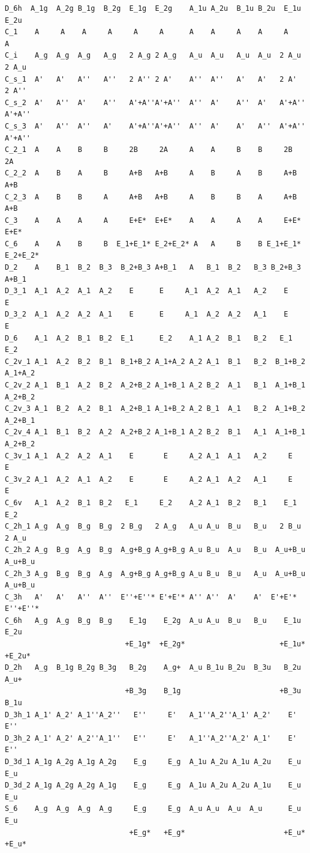 \documentclass[12pt,a4paper]{article}
\begin{document}
\begin{verbatim}
D_6h  A_1g  A_2g B_1g  B_2g  E_1g  E_2g    A_1u A_2u  B_1u B_2u  E_1u  E_2u
C_1    A     A    A     A     A     A      A    A     A    A     A     A
C_i    A_g  A_g  A_g   A_g   2 A_g 2 A_g   A_u  A_u   A_u  A_u  2 A_u  2 A_u
C_s_1  A'   A'   A''   A''   2 A'' 2 A'    A''  A''   A'   A'   2 A'   2 A'' 
C_s_2  A'   A''  A'    A''   A'+A''A'+A''  A''  A'    A''  A'   A'+A'' A'+A''
C_s_3  A'   A''  A''   A'    A'+A''A'+A''  A''  A'    A'   A''  A'+A'' A'+A'' 
C_2_1  A    A    B     B     2B     2A     A    A     B    B     2B     2A
C_2_2  A    B    A     B     A+B   A+B     A    B     A    B     A+B    A+B
C_2_3  A    B    B     A     A+B   A+B     A    B     B    A     A+B    A+B
C_3    A    A    A     A     E+E*  E+E*    A    A     A    A     E+E*   E+E*
C_6    A    A    B     B  E_1+E_1* E_2+E_2* A   A     B    B E_1+E_1* E_2+E_2*
D_2    A    B_1  B_2  B_3  B_2+B_3 A+B_1   A   B_1  B_2   B_3 B_2+B_3 A+B_1 
D_3_1  A_1  A_2  A_1  A_2    E      E     A_1  A_2  A_1   A_2    E      E
D_3_2  A_1  A_2  A_2  A_1    E      E     A_1  A_2  A_2   A_1    E      E
D_6    A_1  A_2  B_1  B_2  E_1      E_2    A_1 A_2  B_1   B_2   E_1    E_2
C_2v_1 A_1  A_2  B_2  B_1  B_1+B_2 A_1+A_2 A_2 A_1  B_1   B_2  B_1+B_2 A_1+A_2
C_2v_2 A_1  B_1  A_2  B_2  A_2+B_2 A_1+B_1 A_2 B_2  A_1   B_1  A_1+B_1 A_2+B_2
C_2v_3 A_1  B_2  A_2  B_1  A_2+B_1 A_1+B_2 A_2 B_1  A_1   B_2  A_1+B_2 A_2+B_1
C_2v_4 A_1  B_1  B_2  A_2  A_2+B_2 A_1+B_1 A_2 B_2  B_1   A_1  A_1+B_1 A_2+B_2
C_3v_1 A_1  A_2  A_2  A_1    E       E     A_2 A_1  A_1   A_2     E      E
C_3v_2 A_1  A_2  A_1  A_2    E       E     A_2 A_1  A_2   A_1     E      E
C_6v   A_1  A_2  B_1  B_2   E_1     E_2    A_2 A_1  B_2   B_1    E_1    E_2
C_2h_1 A_g  A_g  B_g  B_g  2 B_g   2 A_g   A_u A_u  B_u   B_u   2 B_u  2 A_u 
C_2h_2 A_g  B_g  A_g  B_g  A_g+B_g A_g+B_g A_u B_u  A_u   B_u  A_u+B_u A_u+B_u
C_2h_3 A_g  B_g  B_g  A_g  A_g+B_g A_g+B_g A_u B_u  B_u   A_u  A_u+B_u A_u+B_u
C_3h   A'   A'   A''  A''  E''+E''* E'+E'* A'' A''  A'    A'  E'+E'* E''+E''*
C_6h   A_g  A_g  B_g  B_g    E_1g    E_2g  A_u A_u  B_u   B_u    E_1u    E_2u
                            +E_1g*  +E_2g*                      +E_1u*  +E_2u*
D_2h   A_g  B_1g B_2g B_3g   B_2g    A_g+  A_u B_1u B_2u  B_3u   B_2u    A_u+
                            +B_3g    B_1g                       +B_3u    B_1u
D_3h_1 A_1' A_2' A_1''A_2''   E''     E'   A_1''A_2''A_1' A_2'    E'     E''
D_3h_2 A_1' A_2' A_2''A_1''   E''     E'   A_1''A_2''A_2' A_1'    E'     E''
D_3d_1 A_1g A_2g A_1g A_2g    E_g     E_g  A_1u A_2u A_1u A_2u    E_u    E_u
D_3d_2 A_1g A_2g A_2g A_1g    E_g     E_g  A_1u A_2u A_2u A_1u    E_u    E_u
S_6    A_g  A_g  A_g  A_g     E_g     E_g  A_u A_u  A_u  A_u      E_u    E_u
                             +E_g*   +E_g*                       +E_u*  +E_u*
\end{verbatim}
\end{document}
